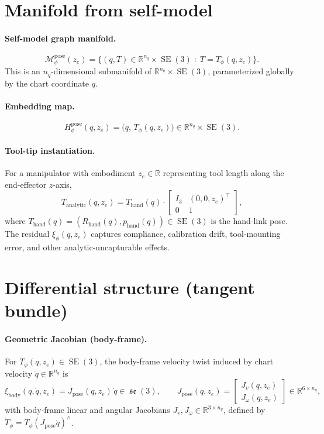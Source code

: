 \documentclass[11pt,a4paper]{article}
\DeclareMathOperator{\SE}{SE}
\DeclareMathOperator{\se}{\mathfrak{se}}
\newcommand{\R}{\mathbb{R}}
\newcommand{\Mpose}{\mathcal{M}_\phi^{\text{pose}}}
\newcommand{\Tphi}{T_\phi}
\newcommand{\Hpose}{H_\phi^{\text{pose}}}
\newcommand{\Jpose}{J_{\text{pose}}}
\begin{document}
\section{Manifold from self-model}

\paragraph{Self-model graph manifold.}
\begin{equation}
\Mpose(z_e) = \bigl\{ (q, T) \in \R^{n_q} \times \SE(3) \;:\; T = \Tphi(q, z_e) \bigr\}.
\end{equation}
This is an $n_q$-dimensional submanifold of $\R^{n_q} \times \SE(3)$, parameterized globally by the chart coordinate $q$.

\paragraph{Embedding map.}
\begin{equation}
\Hpose(q, z_e) = \bigl(q, \, \Tphi(q, z_e)\bigr) \in \R^{n_q} \times \SE(3).
\end{equation}

\paragraph{Tool-tip instantiation.} For a manipulator with embodiment $z_e \in \R$ representing tool length along the end-effector $z$-axis,
\begin{equation}
T_{\text{analytic}}(q, z_e) = T_{\text{hand}}(q) \cdot \begin{bmatrix} I_3 & (0, 0, z_e)^\top \\ 0 & 1 \end{bmatrix},
\end{equation}
where $T_{\text{hand}}(q) = (R_{\text{hand}}(q), p_{\text{hand}}(q)) \in \SE(3)$ is the hand-link pose. The residual $\xi_\phi(q, z_e)$ captures compliance, calibration drift, tool-mounting error, and other analytic-uncapturable effects.

\section{Differential structure (tangent bundle)}
\label{sec:tangent}

\paragraph{Geometric Jacobian (body-frame).} For $\Tphi(q, z_e) \in \SE(3)$, the body-frame velocity twist induced by chart velocity $\dot q \in \R^{n_q}$ is
\begin{equation}
\xi_{\text{body}}(q, \dot q, z_e) = \Jpose(q, z_e) \, \dot q \in \se(3),
\qquad
\Jpose(q, z_e) = \begin{bmatrix} J_v(q, z_e) \\ J_\omega(q, z_e) \end{bmatrix} \in \R^{6 \times n_q},
\end{equation}
with body-frame linear and angular Jacobians $J_v, J_\omega \in \R^{3 \times n_q}$, defined by $\dot \Tphi = \Tphi (\Jpose \dot q)^\wedge$.
\end{document}
